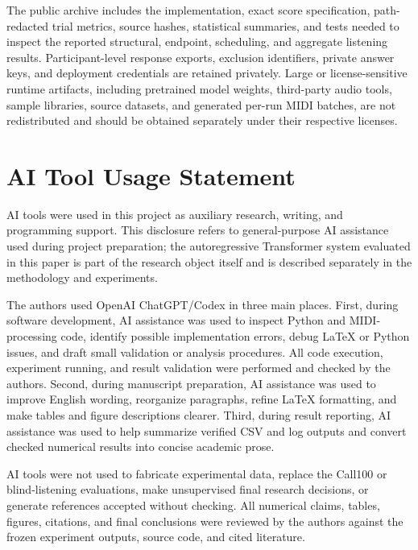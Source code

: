 \documentclass[11pt,a4paper]{article}
\begin{document}
The public archive includes the implementation, exact score specification, path-redacted trial metrics, source hashes, statistical summaries, and tests needed to inspect the reported structural, endpoint, scheduling, and aggregate listening results. Participant-level response exports, exclusion identifiers, private answer keys, and deployment credentials are retained privately. Large or license-sensitive runtime artifacts, including pretrained model weights, third-party audio tools, sample libraries, source datasets, and generated per-run MIDI batches, are not redistributed and should be obtained separately under their respective licenses.


\section*{AI Tool Usage Statement}
\label{sec:ai-tool-usage}

AI tools were used in this project as auxiliary research, writing, and programming support. This disclosure refers to general-purpose AI assistance used during project preparation; the autoregressive Transformer system evaluated in this paper is part of the research object itself and is described separately in the methodology and experiments.

The authors used OpenAI ChatGPT/Codex in three main places. First, during software development, AI assistance was used to inspect Python and MIDI-processing code, identify possible implementation errors, debug LaTeX or Python issues, and draft small validation or analysis procedures. All code execution, experiment running, and result validation were performed and checked by the authors. Second, during manuscript preparation, AI assistance was used to improve English wording, reorganize paragraphs, refine LaTeX formatting, and make tables and figure descriptions clearer. Third, during result reporting, AI assistance was used to help summarize verified CSV and log outputs and convert checked numerical results into concise academic prose.

AI tools were not used to fabricate experimental data, replace the Call100 or blind-listening evaluations, make unsupervised final research decisions, or generate references accepted without checking. All numerical claims, tables, figures, citations, and final conclusions were reviewed by the authors against the frozen experiment outputs, source code, and cited literature.




\end{document}
